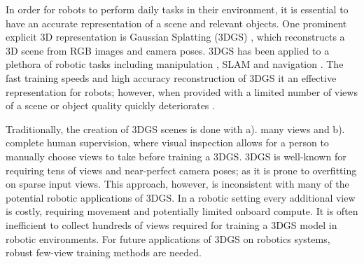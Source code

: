 
In order for robots to perform daily tasks in their environment, it is essential to have an accurate representation of a scene and relevant objects. One prominent explicit 3D representation is Gaussian Splatting (3DGS) \cite{3dgs}, which reconstructs a 3D scene from RGB images and camera poses. 3DGS has been applied to a plethora of robotic tasks including manipulation \cite{lu2024manigaussian,shorinwa2024splat}, SLAM \cite{monoGS, yan2023gs} and navigation \cite{chen2024splatnav,lei2024gaussnav}. The fast training speeds and high accuracy reconstruction of 3DGS it an effective representation for robots; however, when provided with a limited number of views of a scene or object quality quickly deteriorates \cite{swann2024touch}. 

Traditionally, the creation of 3DGS scenes is done with a). many views and b). complete human supervision, where visual inspection allows for a person to manually choose views to take before training a 3DGS. 3DGS is well-known for requiring tens of views and near-perfect camera poses; as it is prone to overfitting on sparse input views.  This approach, however, is inconsistent with many of the potential robotic applications of 3DGS. In a robotic setting every additional view is costly, requiring movement and potentially limited onboard compute. It is often inefficient to collect hundreds of views required for training a 3DGS model in robotic environments. For future applications of 3DGS on robotics systems, robust few-view training methods are needed.

